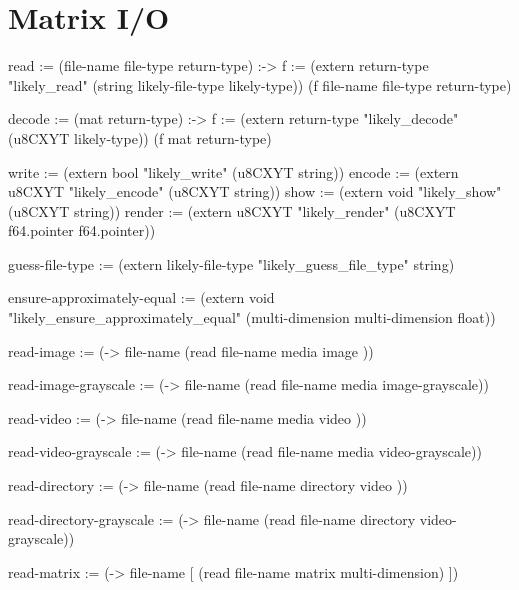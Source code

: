 \documentclass[twoside=false, numbers=noenddot]{scrbook}
\newenvironment{likely}
{ \verbatim }
{ \endverbatim }
\begin{document}
\section{Matrix I/O}
\begin{likely}
read :=
  (file-name file-type return-type) :->
  {
    f := (extern return-type
                 "likely_read"
                 (string likely-file-type likely-type))
    (f file-name file-type return-type)
  }

decode :=
  (mat return-type) :->
  {
    f := (extern return-type
                 "likely_decode"
                 (u8CXYT likely-type))
    (f mat return-type)
  }

write  := (extern bool   "likely_write"  (u8CXYT string))
encode := (extern u8CXYT "likely_encode" (u8CXYT string))
show   := (extern void   "likely_show"   (u8CXYT string))
render := (extern u8CXYT "likely_render" (u8CXYT f64.pointer f64.pointer))

guess-file-type :=
  (extern likely-file-type "likely_guess_file_type" string)

ensure-approximately-equal :=
  (extern void "likely_ensure_approximately_equal" (multi-dimension multi-dimension float))
\end{likely}

\begin{likely}
read-image :=
  (-> file-name (read file-name media     image          ))

read-image-grayscale :=
  (-> file-name (read file-name media     image-grayscale))

read-video :=
  (-> file-name (read file-name media     video          ))

read-video-grayscale :=
  (-> file-name (read file-name media     video-grayscale))

read-directory :=
  (-> file-name (read file-name directory video          ))

read-directory-grayscale :=
  (-> file-name (read file-name directory video-grayscale))

read-matrix :=
  (-> file-name [ (read file-name matrix multi-dimension) ])
\end{likely}
\end{document}
